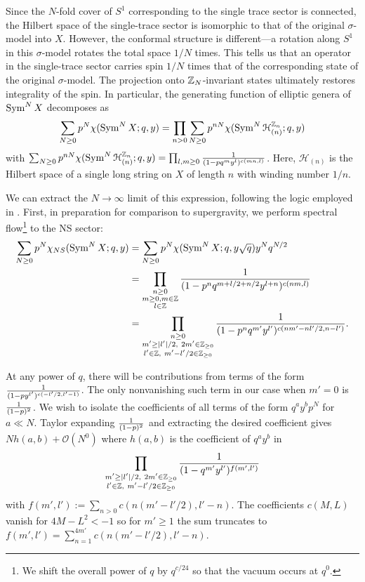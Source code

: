 \documentclass[../main.tex]{subfiles}
\begin{document}
Since the $N$-fold cover of $S^1$ corresponding to the single trace sector is connected, the Hilbert space of the single-trace sector is isomorphic to that of the original $\sigma$-model into $X$.  
However, the conformal structure is different---a rotation along $S^1$ in this $\sigma$-model rotates the total space $1/N$ times.
This tells us that an operator in the single-trace sector carries spin $1/N$ times that of the corresponding state of the original $\sigma$-model. 
The projection onto $\mathbb Z_N$-invariant states ultimately restores integrality of the spin. 
In particular, the generating function of elliptic genera of $\operatorname{Sym}^N X$ decomposes as
\begin{equation}
\sum_{N\geq 0}p^N \chi(\operatorname{Sym}^N X; q, y) = \prod_{n>0}\sum_{N \geq 0}p^{n N}\chi(\operatorname{Sym}^{N}\mathcal{H}^{\mathbb Z_n}_{(n)}; q, y)
\end{equation}
with $\sum_{N \geq 0}p^{n N}\chi(\operatorname{Sym}^{N}\mathcal{H}^{\mathbb Z_n}_{(n)}; q, y) = \prod_{l, m\geq0}{1 \over (1 - p q^m y^l)^{c(mn, l)}}$. Here, $\mathcal{H}_{(n)}$ is the Hilbert space of a single long string on $X$ of length $n$ with winding number $1/n$. 

We can extract the $N \rightarrow \infty$ limit of this expression, following the logic employed in \cite{deBoerEG, MAGOO, BKKP}. First, in preparation for comparison to supergravity, we perform spectral flow\footnote{We shift the overall power of $q$ by $q^{c/24}$ so that the vacuum occurs at $q^0$.} to the NS sector:
\begin{align*}
\sum_{N \geq 0}p^N \chi_{NS}(\operatorname{Sym}^N X; q, y) & = \sum_{N\geq 0}p^N \chi(\operatorname{Sym}^N X; q, y \sqrt{q}) y^N q^{N/2} \\
&= \prod_{\substack{n \geq 0 \\ m \geq 0, m \in \mathbb Z \\ l \in \mathbb Z}} \frac{1}{(1 - p^n q^{m + l/2 + n/2} y^{l + n})^{c(nm,l)}} \\
&= \prod_{\substack{n \geq0 \\ m' \geq |l'|/2, \ 2 m' \in \mathbb Z_{\geq 0} \\ l' \in \mathbb Z, \ m' - l'/2 \in \mathbb Z_{\geq 0}}} \frac{1}{(1 - p^n q^{m'} y^{l'})^{c(nm' - nl'/2,n-l')}}.
\end{align*}

At any power of $q$, there will be contributions from terms of the form ${1 \over (1 - p y^{l'})^{c(-l'/2, l'-1)}}$. The only nonvanishing such term in our case when $m'=0$ is ${1 \over (1 - p)^2}$. We wish to isolate the coefficients of all terms of the form $q^a y^b p^N$ for $a \ll N$. Taylor expanding ${1 \over (1-p)^2}$ and extracting the desired coefficient gives $N h(a, b) + \mathcal{O}(N^0)$ where $h(a, b)$ is the coefficient of $q^a y^b$ in
\begin{equation}\nonumber
\prod_{\substack{m' \geq |l'|/2, \ 2 m' \in \mathbb Z_{\geq 0} \\ l' \in \mathbb Z, \  m' - l'/2 \in \mathbb Z_{\geq 0}}}{1 \over (1 - q^{m'} y^{l'})^{f(m', l')}}
\end{equation}with $f(m', l'):= \sum_{n >0}c(n(m' -  l'/2), l' - n)$.  The coefficients $c(M, L)$ vanish for $4M-L^2 < -1$ so for $m' \geq 1$ the sum truncates to $f(m', l') = \sum_{n=1}^{4m'}c(n(m' -  l'/2), l' - n)$.
\end{document}
